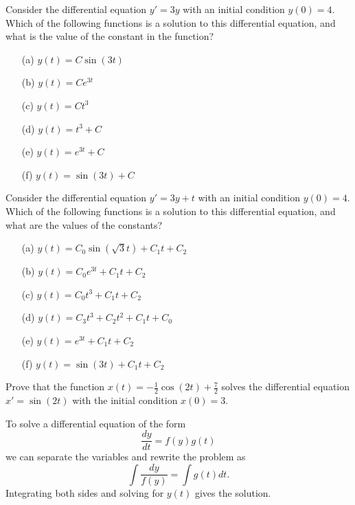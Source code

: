 \begin{problem}
    Consider the differential equation $y' = 3y$ with an initial condition $y(0) = 4$.
    Which of the following functions is a solution to this differential equation, and what
    is the value of the constant in the function?
    \begin{enumerate}
        \item[(a)] $y(t) = C \sin(3 t)$
        \item[(b)] $y(t) = C e^{3t}$
        \item[(c)] $y(t) = C t^3$
        \item[(d)] $y(t) = t^3 + C$
        \item[(e)] $y(t) = e^{3t} + C$
        \item[(f)] $y(t) = \sin(3t) + C$
    \end{enumerate}
\end{problem}

\begin{problem}
    Consider the differential equation $y' = 3y + t$ with an initial condition $y(0) = 4$.
    Which of the following functions is a solution to this differential equation, and what
    are the values of the constants?
    \begin{enumerate}
        \item[(a)] $y(t) = C_0 \sin(\sqrt{3} t) + C_1 t + C_2$
        \item[(b)] $y(t) = C_0 e^{3t} + C_1 t + C_2$
        \item[(c)] $y(t) = C_0 t^3 + C_1 t + C_2$
        \item[(d)] $y(t) = C_3 t^3 + C_2 t^2 + C_1 t + C_0$
        \item[(e)] $y(t) = e^{3t} + C_1 t + C_2$
        \item[(f)] $y(t) = \sin(3t) + C_1 t + C_2$
    \end{enumerate}
\end{problem}

\begin{problem}
    Prove that the function $x(t) = -\frac{1}{2} \cos(2t) + \frac{7}{2}$ solves the
    differential equation $x' = \sin(2t)$ with the initial condition $x(0) =3$.
\end{problem}

\begin{technique}
    To solve a differential equation of the form
    \[ \frac{dy}{dt} = f(y) g(t) \]
    we can separate the variables and rewrite the problem as 
    \[ \int \frac{dy}{f(y)} = \int g(t) dt. \]
    Integrating both sides and solving for $y(t)$ gives the solution.
\end{technique}

